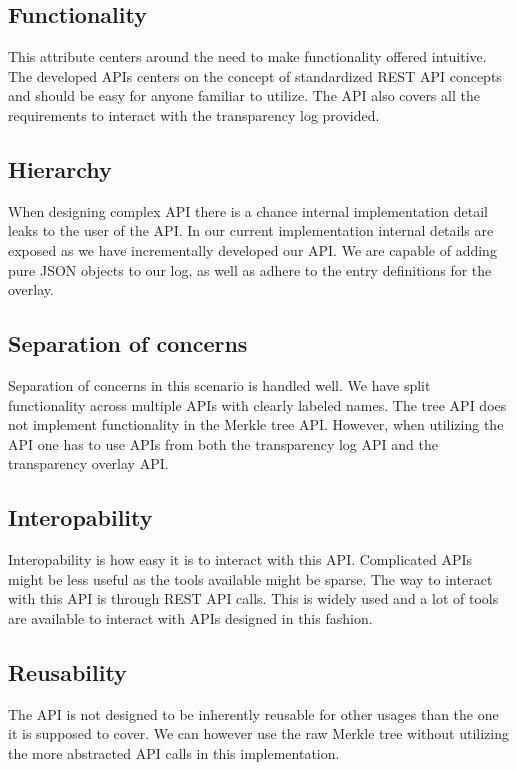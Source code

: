 \documentclass[../Main/thesis.tex]{subfiles}
\begin{document}
\subsection*{Functionality}%
\label{sub:functionality}
This attribute centers around the need to make functionality offered intuitive.
The developed APIs centers on the concept of standardized REST API concepts and
should be easy for anyone familiar to utilize. The API also covers all the
requirements to interact with the transparency log provided.

\subsection*{Hierarchy}%
\label{sub:hierarchy}
When designing complex API there is a chance internal implementation detail
leaks to the user of the API. In our current implementation internal details are
exposed as we have incrementally developed our API. We are capable of adding
pure JSON objects to our log, as well as adhere to the entry definitions for the
overlay.

\subsection*{Separation of concerns}%
\label{sub:seperation_of_concerns}
Separation of concerns in this scenario is handled well. We have split
functionality across multiple APIs with clearly labeled names. The tree API does
not implement functionality in the Merkle tree API. However, when utilizing the
API one has to use APIs from both the transparency log API and the transparency
overlay API.

\subsection*{Interopability}%
\label{sub:interopability}
Interopability is how easy it is to interact with this API. Complicated APIs
might be less useful as the tools available might be sparse.  The way to
interact with this API is through REST API calls. This is widely used and a lot
of tools are available to interact with APIs designed in this fashion.

\subsection*{Reusability}%
\label{sub:reusability}
The API is not designed to be inherently reusable for other usages than the one
it is supposed to cover. We can however use the raw Merkle tree without
utilizing the more abstracted API calls in this implementation.
\end{document}
